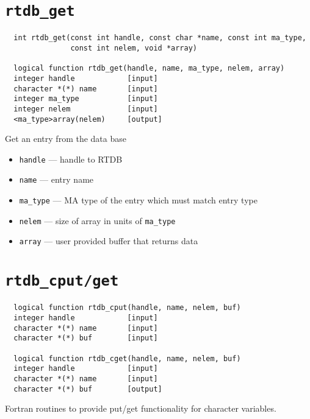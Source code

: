 \section{{\tt rtdb\_get}}
\begin{verbatim}
  int rtdb_get(const int handle, const char *name, const int ma_type,
               const int nelem, void *array)

  logical function rtdb_get(handle, name, ma_type, nelem, array)
  integer handle            [input]
  character *(*) name       [input]
  integer ma_type           [input]
  integer nelem             [input]
  <ma_type>array(nelem)     [output]
\end{verbatim}
Get an entry from the data base
\begin{itemize}
\item {\tt handle} --- handle to RTDB
\item {\tt name} --- entry name
\item {\tt ma\_type} --- MA type of the entry which must match entry type
\item {\tt nelem} --- size of array in units of {\tt ma\_type}
\item {\tt array} --- user provided buffer that returns data
\end{itemize}

\section{{\tt rtdb\_cput/get}}
\begin{verbatim}
  logical function rtdb_cput(handle, name, nelem, buf)
  integer handle            [input]
  character *(*) name       [input]
  character *(*) buf        [input]

  logical function rtdb_cget(handle, name, nelem, buf)
  integer handle            [input]
  character *(*) name       [input]
  character *(*) buf        [output]
\end{verbatim}
Fortran routines to provide put/get functionality for character
variables.

